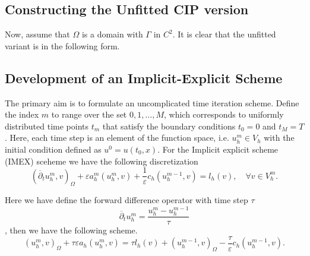\subsection{Constructing the Unfitted CIP version}%
\label{sub:constructing_the_unfitted_cip_version}

Now, assume that $\Omega $ is a domain with $\Gamma $ in $C^2$. It is clear that the unfitted variant is in the following form.




\subsection{Development of an Implicit-Explicit Scheme}
\label{sub:implicit_explicit_scheme}

The primary aim is to formulate an uncomplicated time iteration scheme. Define the index $m$ to range over the set ${0, 1, \ldots, M}$, which corresponds to uniformly distributed time points $t_{m}$ that satisfy the boundary conditions $t_{0} = 0$
and $t_{M} = T$. Here, each time step is an element of the function space, i.e. $u^{m}_{h} \in V_{h}$  with the initial condition defined as $u^{0} = u( t_{0},x )$.
For the Implicit explicit scheme (IMEX) sceheme we have the following discretization
\[
( \overline{\partial } _{t} u^{m}_{h}, v   )_{\Omega } + \varepsilon a^{m}_{h}( u_{h}^{m} , v) + \frac{1}{\varepsilon } c_{h} (  u_{h}^{m-1}, v)  = l_{h}( v) , \quad \forall v \in V_{h}^{m}.
\]

Here we have define the forward difference operator with time step $\tau $
\[
\overline{\partial } _{t} u_{h}^{m} = \frac{u_{h}^{m} - u_{h}^{m-1}}{ \tau }
\]
, then we have the following scheme.
\[
( u_{h}^{m},v )_{\Omega }  + \tau \varepsilon a_{h}( u_{h}^{m} , v)   = \tau  l_{h}( v) +   ( u_{h}^{m-1},v )_{\Omega } - \frac{\tau}{\varepsilon } c_{h} (  u_{h}^{m-1}, v) .
\]



